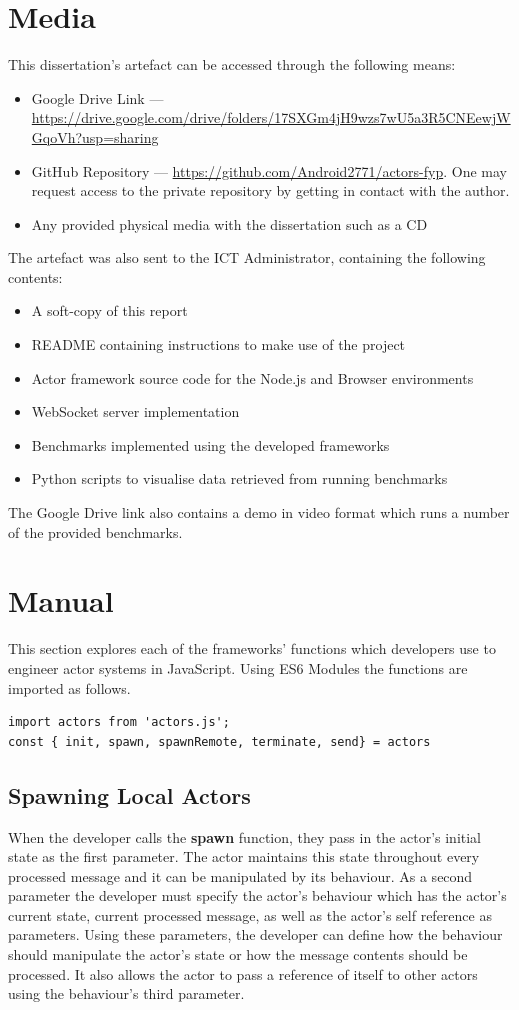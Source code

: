 \documentclass[oneside]{um-fict}
\begin{document}
\appendix
\chapter{Media}\label{appendix:media}
This dissertation's artefact can be accessed through the following means:
\begin{itemize}
\item Google Drive Link --- \url{https://drive.google.com/drive/folders/17SXGm4jH9wzs7wU5a3R5CNEewjWGqoVh?usp=sharing}
\item GitHub Repository --- \url{https://github.com/Android2771/actors-fyp}. One may request access to the private repository by getting in contact with the author.
\item Any provided physical media with the dissertation such as a CD
\end{itemize}

The artefact was also sent to the ICT Administrator, containing the following contents:
\begin{itemize}
\item A soft-copy of this report
\item README containing instructions to make use of the project
\item Actor framework source code for the Node.js and Browser environments
\item WebSocket server implementation
\item Benchmarks implemented using the developed frameworks
\item Python scripts to visualise data retrieved from running benchmarks
\end{itemize}

The Google Drive link also contains a demo in video format which runs a number of the provided benchmarks.
\chapter{Manual}\label{appendix:manual}
This section explores each of the frameworks' functions which developers use to engineer actor systems in JavaScript. Using ES6 Modules the functions are imported as follows.
\begin{lstlisting}
import actors from 'actors.js';
const { init, spawn, spawnRemote, terminate, send} = actors
\end{lstlisting}
\section{Spawning Local Actors}
When the developer calls the \textbf{spawn} function, they pass in the actor's initial state as the first parameter. The actor maintains this state throughout every processed message and it can be manipulated by its behaviour. As a second parameter the developer must specify the actor's behaviour which has the actor's current state, current processed message, as well as the actor's self reference as parameters. Using these parameters, the developer can define how the behaviour should manipulate the actor's state or how the message contents should be processed. It also allows the actor to pass a reference of itself to other actors using the behaviour's third parameter.
\end{document}
